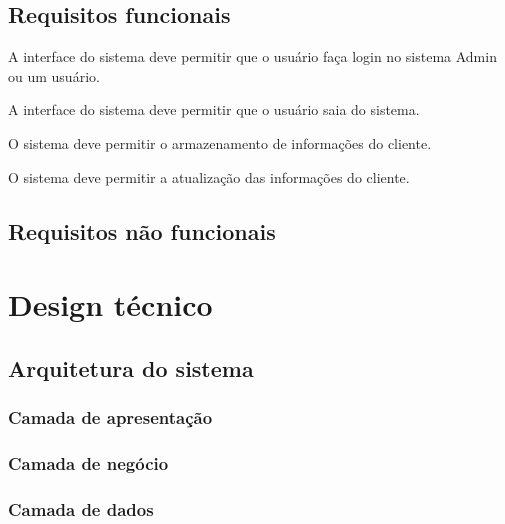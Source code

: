 \subsection{Requisitos funcionais}




A interface do sistema deve permitir que o usuário faça login no sistema
Admin ou um usuário.


A interface do sistema deve permitir que o usuário saia do sistema.



O sistema deve permitir o armazenamento de informações do cliente.


O sistema deve permitir a atualização das informações do cliente.


\subsection{Requisitos não funcionais}







\section{Design técnico}



\subsection{Arquitetura do sistema}



\subsubsection{Camada de apresentação}


\subsubsection{Camada de negócio}



\subsubsection{Camada de dados}




